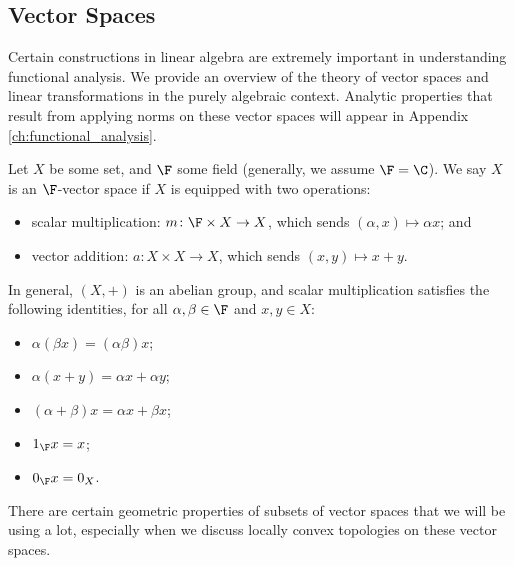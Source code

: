 \subsection{Vector Spaces}%
Certain constructions in linear algebra are extremely important in understanding functional analysis. We provide an overview of the theory of vector spaces and linear transformations in the purely algebraic context. Analytic properties that result from applying norms on these vector spaces will appear in Appendix \ref{ch:functional_analysis}.
\begin{definition}
  Let $X$ be some set, and $\F$ some field (generally, we assume $\F = \C$). We say $X$ is an $\F$-vector space if $X$ is equipped with two operations:
  \begin{itemize}
    \item scalar multiplication: $m\colon \F\times X \rightarrow X$, which sends $\left(\alpha,x\right)\mapsto \alpha x$; and
    \item vector addition: $a\colon X\times X \rightarrow X$, which sends $\left(x,y\right)\mapsto x + y$.
  \end{itemize}
  In general, $\left(X,+\right)$ is an abelian group, and scalar multiplication satisfies the following identities, for all $\alpha,\beta \in \F$ and $x,y\in X$:
  \begin{itemize}
    \item $\alpha \left(\beta x\right) = \left(\alpha\beta\right)x$;
    \item $\alpha\left(x+y\right) = \alpha x + \alpha y$;
    \item $\left(\alpha + \beta\right)x = \alpha x + \beta x$;
    \item $1_{\F}x = x$;
    \item $0_{\F} x = 0_X$.
  \end{itemize}
\end{definition}
There are certain geometric properties of subsets of vector spaces that we will be using a lot, especially when we discuss locally convex topologies on these vector spaces.
